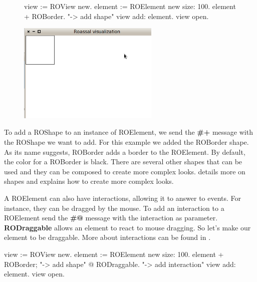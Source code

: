 \documentclass[a4paper,10pt,twoside]{book}
\begin{document}
\begin{figure}[H]
      \begin{minipage}[t]{0.5\textwidth}
      \vspace{0pt}
\begin{code}{}
view := ROView new.
element := ROElement new size: 100.
element 
	+ ROBorder. "-> add shape"
view add: element.
view open.
\end{code}
   \end{minipage}
   \hfill
   \begin{minipage}[t]{0.6\textwidth}
      \vspace{0pt} \raggedright
       \centering
		\includegraphics[width=0.6\textwidth]{ex2}
   \end{minipage}
\label{fig:ex2}
\end{figure}

To add a ROShape to an instance of ROElement, we send the \textbf{\#+} message with the ROShape we want to add. For this example we added the ROBorder shape. As its name suggests, ROBorder adds a border to the ROElement. By default, the color for a ROBorder is black. There are several other shapes that can be used and they can be composed to create more complex looks.  details more on shapes and explains how to create more complex looks.

A ROElement can also have interactions, allowing it to answer to events. For instance, they can be dragged by the mouse. To add an interaction to a ROElement send the \textbf{\#@} message with the interaction as parameter. \textbf{RODraggable} allows an element to react to mouse dragging. So let's make our element to be draggable. More about interactions can be found in .

\begin{code}{}
view := ROView new.
element := ROElement new size: 100.
element 
	+ ROBorder; "-> add shape"
	@ RODraggable. "-> add interaction"
view add: element.
view open.
\end{code}
\end{document}

